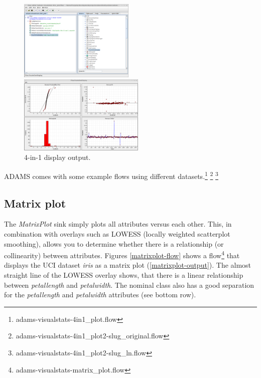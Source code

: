 \documentclass[a4paper]{book}
\begin{document}
\begin{figure}[ht]
  \begin{minipage}[t]{0.5\linewidth}
    \centering
    \includegraphics[width=5.5cm]{images/4in1-flow.png}
    \caption{Flow using 4-in-1 display.}
    \label{4in1-flow}
  \end{minipage}
  \hspace{0.5cm}
  \begin{minipage}[t]{0.5\linewidth}
    \centering
    \includegraphics[width=6.0cm]{images/4in1-output.png}
    \caption{4-in-1 display output.}
    \label{4in1-output}
  \end{minipage}
\end{figure}

\noindent ADAMS comes with some example flows using different 
datasets.\footnote{adams-visualstats-4in1\_plot.flow}
\footnote{adams-visualstats-4in1\_plot2-slug\_original.flow}
\footnote{adams-visualstats-4in1\_plot2-slug\_ln.flow}

\clearpage
\subsection{Matrix plot}
The \textit{MatrixPlot} sink simply plots all attributes versus each other.
This, in combination with overlays such as LOWESS (locally weighted 
scatterplot smoothing), allows you to determine whether there is a relationship
(or collinearity) between attributes. Figures \ref{matrixplot-flow} shows a 
flow\footnote{adams-visualstats-matrix\_plot.flow} that displays the UCI dataset
\textit{iris} as a matrix plot (\ref{matrixplot-output}). The almost straight 
line of the LOWESS overlay shows, that there is a linear relationship 
between \textit{petallength} and \textit{petalwidth}. The nominal class also
has a good separation for the \textit{petallength} and \textit{petalwidth}
attributes (see bottom row).
\end{document}
